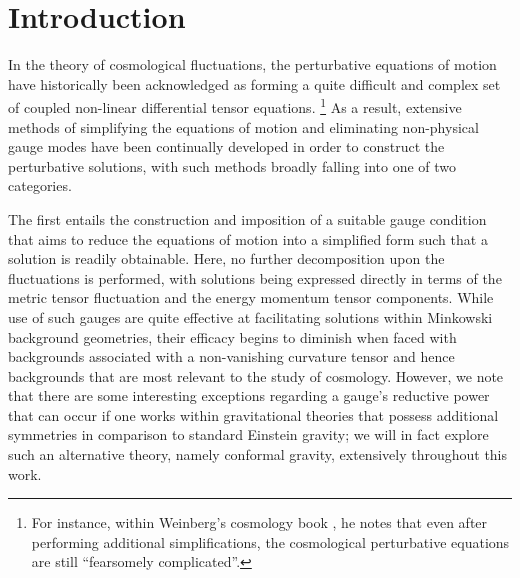 
\chapter{Introduction}
\label{c:introduction}

In the theory of cosmological fluctuations, the perturbative equations of motion have historically been acknowledged as forming a quite difficult and complex set of coupled non-linear differential tensor equations. 
\footnote{For instance, within Weinberg's cosmology book \cite{weinberg_2008}, he notes that even after performing additional simplifications, the cosmological perturbative equations are still ``fearsomely complicated''.}
As a result, extensive methods of simplifying the equations of motion and eliminating non-physical gauge modes have been continually developed in order to construct the perturbative solutions, with such methods broadly falling into one of two categories. 

The first entails the construction and imposition of a suitable gauge condition that aims to reduce the equations of motion into a simplified form such that a solution is readily obtainable. Here, no further decomposition upon the fluctuations is performed, with solutions being expressed directly in terms of the metric tensor fluctuation and the energy momentum tensor components. While use of such gauges are quite effective at facilitating solutions within Minkowski background geometries, their efficacy begins to diminish when faced with backgrounds associated with a non-vanishing curvature tensor and hence backgrounds that are most relevant to the study of cosmology. However, we note that there are some interesting exceptions regarding a gauge's reductive power that can occur if one works within gravitational theories that possess additional symmetries in comparison to standard Einstein gravity; we will in fact explore such an alternative theory, namely conformal gravity, extensively throughout this work. 

